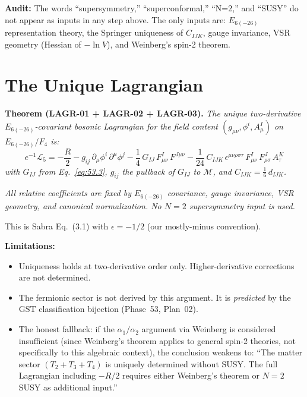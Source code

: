 \textbf{Audit:} The words ``supersymmetry,'' ``superconformal,''
``N=2,'' and ``SUSY'' do not appear as inputs in any step above.
The only inputs are: $E_{6(-26)}$ representation theory, the Springer
uniqueness of $C_{IJK}$, gauge invariance, VSR geometry
(Hessian of $-\ln V$), and Weinberg's spin-2 theorem.



\section{The Unique Lagrangian}

\textbf{Theorem (LAGR-01 + LAGR-02 + LAGR-03).}
\textit{The unique two-derivative $E_{6(-26)}$-covariant bosonic Lagrangian
for the field content $(g_{\mu\nu}, \phi^i, A^I_\mu)$ on
$E_{6(-26)}/F_4$ is:}
\begin{equation}\label{eq:53.7}
  e^{-1}\mathcal{L}_5 = -\frac{R}{2}
    - g_{ij}\,\partial_\mu\phi^i\,\partial^\mu\phi^j
    - \frac{1}{4}\,G_{IJ}\,F^I_{\mu\nu}\,F^{J\mu\nu}
    - \frac{1}{24}\,C_{IJK}\,\epsilon^{\mu\nu\rho\sigma\tau}\,
      F^I_{\mu\nu}\,F^J_{\rho\sigma}\,A^K_\tau
\end{equation}
\textit{with $G_{IJ}$ from Eq.~\eqref{eq:53.3}, $g_{ij}$ the pullback
of $G_{IJ}$ to $\mathcal{M}$, and $C_{IJK} = \tfrac{1}{6}\,d_{IJK}$.}

\textit{All relative coefficients are fixed by $E_{6(-26)}$ covariance,
gauge invariance, VSR geometry, and canonical normalization.
No $N=2$ supersymmetry input is used.}

This is Sabra Eq.~(3.1) with $\epsilon = -1/2$ (our mostly-minus convention).

\textbf{Limitations:}
\begin{itemize}
  \item Uniqueness holds at two-derivative order only. Higher-derivative
    corrections are not determined.
  \item The fermionic sector is not derived by this argument. It is
    \emph{predicted} by the GST classification bijection (Phase~53, Plan~02).
  \item The honest fallback: if the $\alpha_1/\alpha_2$ argument via Weinberg
    is considered insufficient (since Weinberg's theorem applies to general
    spin-2 theories, not specifically to this algebraic context), the
    conclusion weakens to: ``The matter sector $(T_2 + T_3 + T_4)$ is
    uniquely determined without SUSY. The full Lagrangian including $-R/2$
    requires either Weinberg's theorem or $N=2$ SUSY as additional input.''
\end{itemize}


